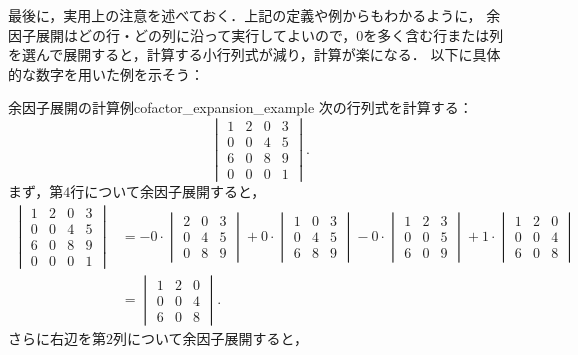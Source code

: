 最後に，実用上の注意を述べておく．上記の定義や例からもわかるように，
余因子展開はどの行・どの列に沿って実行してよいので，$0$を多く含む行または列を選んで展開すると，計算する小行列式が減り，計算が楽になる．
以下に具体的な数字を用いた例を示そう：

\begin{example}{余因子展開の計算例}{cofactor_expansion_example}
  次の行列式を計算する：
  \[
  \begin{vmatrix}
    1 & 2 & 0 & 3 \\
    0 & 0 & 4 & 5 \\
    6 & 0 & 8 & 9 \\
    0 & 0 & 0 & 1
  \end{vmatrix}.
  \]
  まず，第$4$行について余因子展開すると，
  \begin{align*}
  \begin{vmatrix}
    1 & 2 & 0 & 3 \\
    0 & 0 & 4 & 5 \\
    6 & 0 & 8 & 9 \\
    0 & 0 & 0 & 1
  \end{vmatrix}
  &=
  -0 \cdot
  \begin{vmatrix}
    2 & 0 & 3 \\
    0 & 4 & 5 \\
    0 & 8 & 9
  \end{vmatrix}
  +0 \cdot
  \begin{vmatrix}
    1 & 0 & 3 \\
    0 & 4 & 5 \\
    6 & 8 & 9
  \end{vmatrix} 
  -0 \cdot
  \begin{vmatrix}
    1 & 2 & 3 \\
    0 & 0 & 5 \\
    6 & 0 & 9
  \end{vmatrix}
  +1 \cdot
  \begin{vmatrix}
    1 & 2 & 0 \\
    0 & 0 & 4 \\
    6 & 0 & 8
  \end{vmatrix} \\
  &=
  \begin{vmatrix}
    1 & 2 & 0 \\
    0 & 0 & 4 \\
    6 & 0 & 8
  \end{vmatrix}.
  \end{align*}
  さらに右辺を第$2$列について余因子展開すると，
  \begin{align*}

\end{align*}
\end{example}
